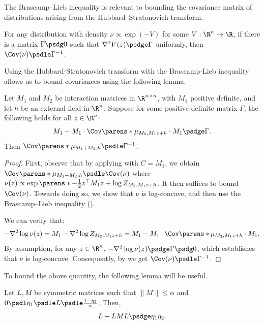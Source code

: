 \documentclass[11pt,letterpaper]{article}
\begin{document}
    The Brascamp--Lieb inequality is relevant to bounding the covariance matrix of distributions arising from the Hubbard--Stratonovich transform.
    \begin{theorem} \label{thm:brascamp-lieb}
        For any distribution with density $\nu\propto\exp(-V)$ for some $V:\R^n\to\R$, if there is a matrix $\Gamma\psdg 0$ such that $\nabla^2 V(z)\psdge\Gamma$ uniformly, then
        \(
            \Cov(\nu) \psdle \Gamma^{-1}.
        \)
    \end{theorem}

    Using the Hubbard-Stratonovich transform with the Brascamp-Lieb inequality allows us to bound covariances using the following lemma.

    \begin{lemma}   \label{lem:interaction-sum-cov-bound}
        Let $M_1$ and $M_2$ be interaction matrices in $\R^{n\times n}$, with $M_1$ positive definite, and let $h$ be an external field in $\R^n$.
        Suppose for some positive definite matrix $\Gamma$, the following holds for all $z\in\R^n$:
        \[
            M_1 - M_1\cdot \Cov\parens*{\mu_{M_2, M_1z + h}} \cdot M_1 \psdge \Gamma.
        \]
        Then $\Cov\parens*{\mu_{M_1+M_2, h}} \psdle \Gamma^{-1}$.
    \end{lemma}
    \begin{proof}
        First, observe that by applying  with $C = M_1$, we obtain $\Cov\parens*{\mu_{M_1+M_2, h}} \psdle \Cov(\nu)$ where $\nu(z)\propto\exp\parens*{-\frac{1}{2}z^{\top}M_1z + \log Z_{M_2, M_1 z + h}}$.
        It then suffices to bound $\Cov(\nu)$.
        Towards doing so, we show that $\nu$ is log-concave, and then use the Brascamp--Lieb inequality ().
    
        We can verify that:
        \[
            -\nabla^2\log\nu(z) = M_1 - \nabla^2 \log Z_{M_2, M_1z + h} = M_1 - M_1\cdot \Cov\parens*{\mu_{M_2, M_1z+h}} \cdot M_1.
        \]
        By assumption, for any $z\in\R^n$, $-\nabla^2\log\nu(z) \psdge \Gamma\psdg 0$, which establishes that $\nu$ is log-concave.
        Consequently, by  we get $\Cov(\nu)\psdle\Gamma^{-1}$.
    \end{proof}

    To bound the above quantity, the following lemma will be useful.
    
    \begin{fact}
        \label{prop:prop-hs-trick}
        Let $L,M$ be symmetric matrices such that $\|M\| \le \alpha$ and $0 \psdl \eta_1 \psdle L \psdle \frac{1-\eta_2}{\alpha}$. Then,
        \[ L - LML \psdge \eta_1\eta_2. \]
    \end{fact}
\end{document}
